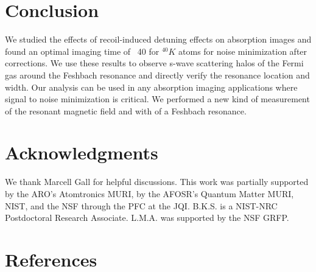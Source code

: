 \documentclass[12pt]{iopart}
\begin{document}
\section{Conclusion}
We studied the effects of recoil-induced detuning effects on absorption images and found an optimal imaging time of ~40\us{} for $^{40}K$ atoms for noise minimization after corrections. We use these results to observe s-wave scattering halos of the Fermi gas around the Feshbach resonance and directly verify the resonance location and width. Our analysis can be used in any absorption imaging applications where signal to noise minimization is critical. We performed a new kind of measurement of the resonant magnetic field and with of a Feshbach resonance. 
\section*{Acknowledgments}
We thank Marcell Gall for helpful discussions. This work was partially supported by the ARO’s Atomtronics MURI, by the
AFOSR’s Quantum Matter MURI, NIST, and the NSF through the PFC at the JQI. B.K.S. is
a NIST-NRC Postdoctoral Research Associate. L.M.A. was supported by the NSF GRFP.

\section*{References}
{}

\end{document}
